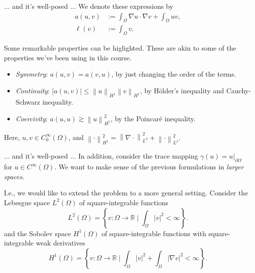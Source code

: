 \documentclass{beamer}
\newcommand{\norm}[1]{\left\lVert #1 \right\rVert}
\begin{document}
\begin{frame}{... and it's well-posed ...}
    We denote these expressions by
    \begin{align*}
        a(u,v) &:= \int_{\Omega} \nabla u \cdot \nabla v + \int_{\Omega} uv, \\
        \ell(v) &:= \int_{\Omega} v.
    \end{align*}

    \pause

    Some remarkable properties can be higlighted.
    These are akin to some of the properties we've been using in this course.

    \begin{itemize}
        \item \emph{Symmetry}: \(a(u,v) = a(v,u)\), by just changing the order of the terms.
        \item \emph{Continuity}: \(|a(u,v)| \leq \norm{u}_{H^1} \norm{v}_{H^1}\), by Hölder's inequality and Cauchy-Schwarz inequality.
        \item \emph{Coercivity}: \(a(u,u) \gtrsim \norm{u}_{H^1}^2\), by the Poincaré inequality.
    \end{itemize}
    Here, \(u, v \in C_0^\infty(\Omega)\), and \(\norm{\cdot}_{H^1}^2 = \norm{\nabla \cdot}_{L^2}^2 + \norm{\cdot}_{L^2}^2\).
\end{frame}

\begin{frame}{... and it's well-posed ...}
    In addition, consider the trace mapping \(\gamma(u) = u|_{\partial \Omega}\) for \(u \in C^\infty(\Omega)\).
    We want to make sense of the previous formulations in \emph{larger spaces}.

    \pause

    I.e., we would like to extend the problem to a more general setting.
    Consider the Lebesgue space \(L^2(\Omega)\) of square-integrable functions
    \begin{equation*}
        L^2(\Omega) = \left\{ v: \Omega \to \mathbb{R} \mid \int_{\Omega} |v|^2 < \infty \right\}.
    \end{equation*}
    and the Sobolev space \(H^1(\Omega)\) of square-integrable functions with square-integrable weak derivatives
    \begin{equation*}
        H^1(\Omega) = \left\{ v: \Omega \to \mathbb{R} \mid \int_{\Omega} |v|^2 + \int_{\Omega} |\nabla v|^2 < \infty \right\}.
    \end{equation*}
\end{frame}
\end{document}
